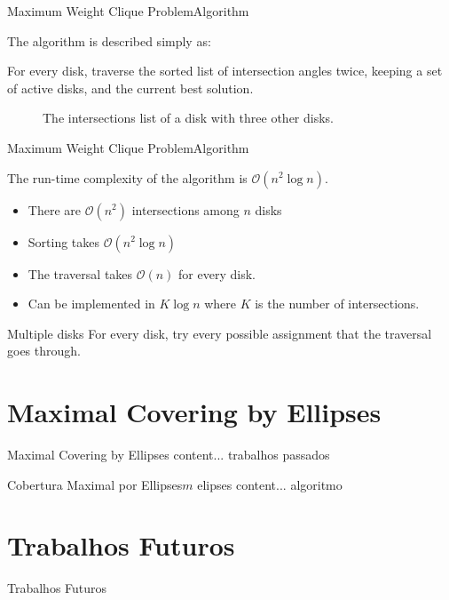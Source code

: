 \documentclass{beamer}
\newcommand{\bigO}{\mathscr{O}}
\begin{document}
\begin{frame}{Maximum Weight Clique Problem}{Algorithm}
	
	The algorithm is described simply as:
	
	For every disk, traverse the sorted list of intersection angles twice, keeping a set of active disks, and the current best solution.
	
\begin{figure}[H]
	\centering
	
	\caption{The intersections list of a disk with three other disks.}
	
	\label{fig:array_disks}
\end{figure}
\end{frame}


\begin{frame}{Maximum Weight Clique Problem}{Algorithm}
	
	The run-time complexity of the algorithm is $\bigO(n^2\log{n})$.
	
	\begin{itemize}
		\item There are $\bigO(n^2)$ intersections among $n$ disks
		
		\item Sorting takes $\bigO(n^2\log{n})$
		
		\item The traversal takes $\bigO(n)$ for every disk.
		
		\item Can be implemented in $K\log{n}$ where $K$ is the number of intersections. 
	\end{itemize}

\begin{block}{Multiple disks}
	For every disk, try every possible assignment that the traversal goes through.
\end{block}
	

	
	
\end{frame}

\section{Maximal Covering by Ellipses}

\begin{frame}{Maximal Covering by Ellipses}
	content... trabalhos passados
\end{frame}

\begin{frame}{Cobertura Maximal por Ellipses}{$m$ elipses}
	content... algoritmo
\end{frame}

\section{Trabalhos Futuros}

\begin{frame}{Trabalhos Futuros}

\end{frame}
\end{document}
